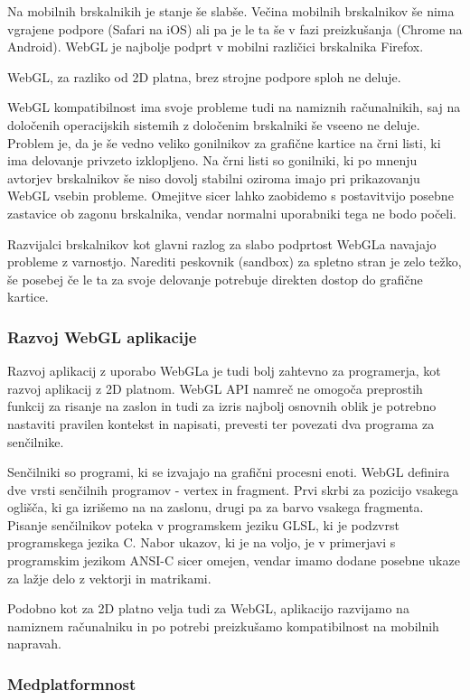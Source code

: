 Na mobilnih brskalnikih je stanje še slabše. Večina mobilnih brskalnikov še nima vgrajene podpore (Safari na iOS) ali pa je le ta še v fazi preizkušanja (Chrome na Android). WebGL je najbolje podprt v mobilni različici brskalnika Firefox.

WebGL, za razliko od 2D platna, brez strojne podpore sploh ne deluje. 

WebGL kompatibilnost ima svoje probleme tudi na namiznih računalnikih, saj na določenih operacijskih sistemih z določenim brskalniki še vseeno ne deluje. Problem je, da je še vedno veliko gonilnikov za grafične kartice na črni listi, ki ima delovanje privzeto izklopljeno. Na črni listi so gonilniki, ki po mnenju avtorjev brskalnikov še niso dovolj stabilni oziroma imajo pri prikazovanju WebGL vsebin probleme. Omejitve sicer lahko zaobidemo s postavitvijo posebne zastavice ob zagonu brskalnika, vendar normalni uporabniki tega ne bodo počeli.

Razvijalci brskalnikov kot glavni razlog za slabo podprtost WebGLa navajajo probleme z varnostjo. Narediti peskovnik (sandbox) za spletno stran je zelo težko, še posebej če le ta za svoje delovanje potrebuje direkten dostop do grafične kartice.

\subsubsection{Razvoj WebGL aplikacije}

Razvoj aplikacij z uporabo WebGLa je tudi bolj zahtevno za programerja, kot razvoj aplikacij z 2D platnom. WebGL API namreč ne omogoča preprostih funkcij za risanje na zaslon in tudi za izris najbolj osnovnih oblik je potrebno nastaviti pravilen kontekst in napisati, prevesti ter povezati dva programa za senčilnike. 

Senčilniki so programi, ki se izvajajo na grafični procesni enoti. WebGL definira dve vrsti senčilnih programov - vertex in fragment. Prvi skrbi za pozicijo vsakega oglišča, ki ga izrišemo na na zaslonu, drugi pa za barvo vsakega fragmenta. Pisanje senčilnikov poteka v programskem jeziku GLSL, ki je podzvrst programskega jezika C. Nabor ukazov, ki je na voljo, je v primerjavi s programskim jezikom ANSI-C sicer omejen, vendar imamo dodane posebne ukaze za lažje delo z vektorji in matrikami.

Podobno kot za 2D platno velja tudi za WebGL, aplikacijo razvijamo na namiznem računalniku in po potrebi preizkušamo kompatibilnost na mobilnih napravah.

\subsubsection{Medplatformnost}

